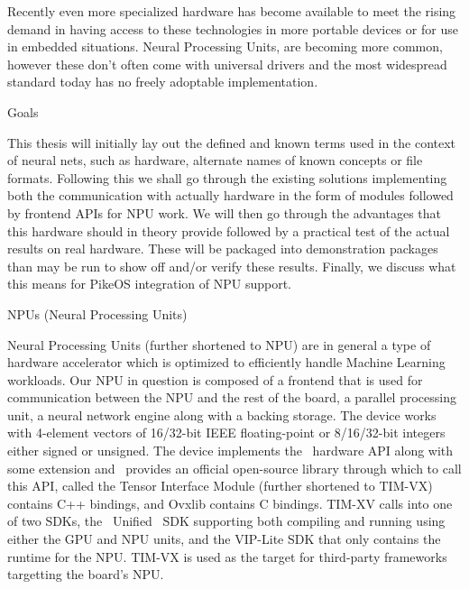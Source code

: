 Recently even more specialized hardware has become available
to meet the rising demand in having access to these technologies
in more portable devices or for use in embedded situations.
Neural Processing Units,
are becoming more common,
however these don't often come with universal drivers
and the most widespread standard today has no freely adoptable implementation.

\sec Goals

This thesis will initially lay out the defined and known terms used in the context of neural nets, such as hardware, alternate names of known concepts or file formats.
Following this we shall go through the existing solutions implementing both the communication with actually hardware in the form of modules followed by frontend APIs for NPU work.
We will then go through the advantages that this hardware should in theory provide followed by a practical test of the actual results on real hardware.
These will be packaged into demonstration packages than may be run to show off and/or verify these results.
Finally, we discuss what this means for PikeOS integration of NPU support.

\sec NPUs (Neural Processing Units)

Neural Processing Units (further shortened to NPU) are in general a type of hardware accelerator which is
optimized to efficiently handle Machine Learning workloads.
Our NPU in question is composed of a frontend that is used for
communication between the NPU and the rest of the board,
a parallel processing unit,
a neural network engine
along with a backing storage.
The device works with 4-element vectors of 16/32-bit IEEE floating-point or 8/16/32-bit integers either signed or unsigned.
The device implements the \OpenVX~hardware API
along with some extension and
\VeriSilicon~provides an official open-source library through which to call this API,
called the
Tensor Interface Module
(further shortened to TIM-VX) contains C++ bindings,
and Ovxlib contains C bindings.
TIM-XV calls into one of two SDKs, the \VeriSilicon~Unified \OpenVX~SDK
supporting both compiling and running using either the GPU and NPU units,
and the VIP-Lite SDK that only contains the runtime for the NPU.
TIM-VX is used as the target for third-party frameworks targetting the board's NPU.


